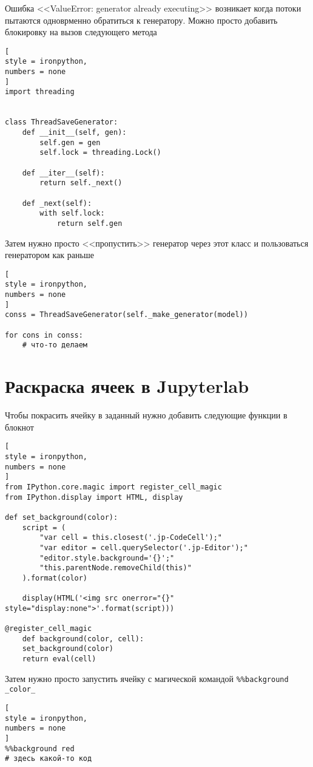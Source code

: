 \documentclass[%
	11pt,
	a4paper,
	utf8,
		]{article}
\begin{document}
Ошибка <<ValueError: generator already executing>> возникает когда потоки пытаются одноврменно обратиться к генератору. Можно просто добавить блокировку на вызов следующего метода
\begin{lstlisting}[
style = ironpython,
numbers = none
]
import threading


class ThreadSaveGenerator:
	def __init__(self, gen):
		self.gen = gen
		self.lock = threading.Lock()
	
	def __iter__(self):
		return self._next()
	
	def _next(self):
		with self.lock:
			return self.gen
\end{lstlisting}

Затем нужно просто <<пропустить>> генератор через этот класс и пользоваться генератором как раньше
\begin{lstlisting}[
style = ironpython,
numbers = none
]
conss = ThreadSaveGenerator(self._make_generator(model))

for cons in conss:
    # что-то делаем
\end{lstlisting}



\section{Раскраска ячеек в Jupyterlab}

Чтобы покрасить ячейку в заданный нужно добавить следующие функции в блокнот
\begin{lstlisting}[
style = ironpython,
numbers = none
]
from IPython.core.magic import register_cell_magic
from IPython.display import HTML, display

def set_background(color):    
	script = (
		"var cell = this.closest('.jp-CodeCell');"
		"var editor = cell.querySelector('.jp-Editor');"
		"editor.style.background='{}';"
		"this.parentNode.removeChild(this)"
	).format(color)

	display(HTML('<img src onerror="{}" style="display:none">'.format(script)))

@register_cell_magic
	def background(color, cell):
	set_background(color)
	return eval(cell)
\end{lstlisting}

Затем нужно просто запустить ячейку с магической командой \verb|%%background _color_|
\begin{lstlisting}[
style = ironpython,
numbers = none
]
%%background red
# здесь какой-то код
\end{lstlisting}
\end{document}
